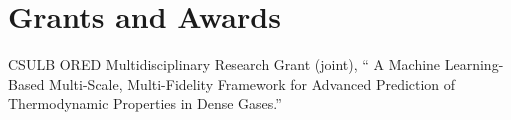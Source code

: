 \documentclass[11pt,letterpaper]{report}
\begin{document}





    \section*{Grants and Awards}

    \begin{tablist}

    \item[2024] \tab{}CSULB ORED Multidisciplinary Research Grant (joint), `` A Machine Learning-Based Multi-Scale, Multi-Fidelity
    Framework for Advanced Prediction of Thermodynamic Properties in Dense Gases.''

    \end{tablist}



\end{document}
